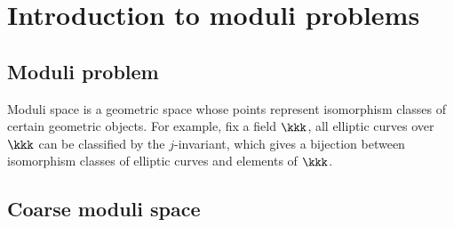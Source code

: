 \section{Introduction to moduli problems}


\subsection{Moduli problem}
    
    Moduli space is a geometric space whose points represent isomorphism classes of certain geometric objects.
    For example, fix a field \(\kkk\), all elliptic curves over \(\kkk\) can be classified by the \(j\)-invariant, which gives a bijection between isomorphism classes of elliptic curves and elements of \(\kkk\).


\subsection{Coarse moduli space}